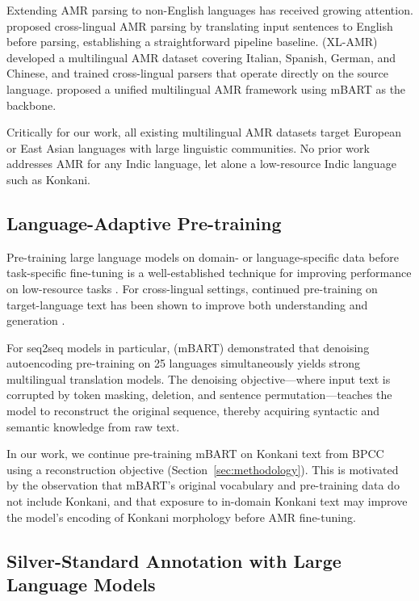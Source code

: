 Extending AMR parsing to non-English languages has received growing attention. \citet{damonte2017cross} proposed cross-lingual AMR parsing by translating input sentences to English before parsing, establishing a straightforward pipeline baseline. \citet{blloshmi2020xl} (XL-AMR) developed a multilingual AMR dataset covering Italian, Spanish, German, and Chinese, and trained cross-lingual parsers that operate directly on the source language. \citet{sheng2021one} proposed a unified multilingual AMR framework using mBART as the backbone.

Critically for our work, all existing multilingual AMR datasets target European or East Asian languages with large linguistic communities. No prior work addresses AMR for any Indic language, let alone a low-resource Indic language such as Konkani.

\subsection{Language-Adaptive Pre-training}

Pre-training large language models on domain- or language-specific data before task-specific fine-tuning is a well-established technique for improving performance on low-resource tasks \cite{gururangan2020dont}. For cross-lingual settings, continued pre-training on target-language text has been shown to improve both understanding and generation \cite{chau2020parsing, pfeiffer2021unks}.

For seq2seq models in particular, \citet{liu2020multilingual} (mBART) demonstrated that denoising autoencoding pre-training on 25 languages simultaneously yields strong multilingual translation models. The denoising objective—where input text is corrupted by token masking, deletion, and sentence permutation—teaches the model to reconstruct the original sequence, thereby acquiring syntactic and semantic knowledge from raw text.

In our work, we continue pre-training mBART on Konkani text from BPCC using a reconstruction objective (Section~\ref{sec:methodology}). This is motivated by the observation that mBART's original vocabulary and pre-training data do not include Konkani, and that exposure to in-domain Konkani text may improve the model's encoding of Konkani morphology before AMR fine-tuning.

\subsection{Silver-Standard Annotation with Large Language Models}

